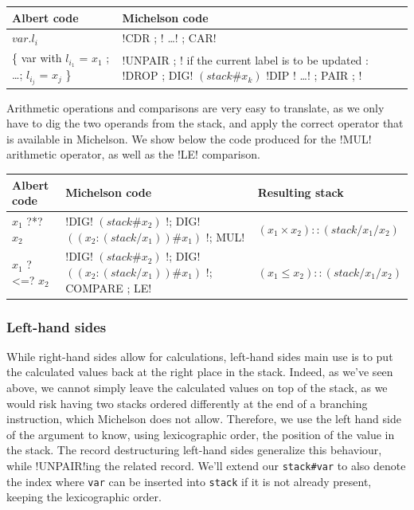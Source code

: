 \documentclass{report}
\begin{document}
{\small
\begin{longtable}{l|p{10cm}}
  Albert code & Michelson code \\
  \hline
  $var.l_i$ & !CDR ; ! \ldots ! ; CAR! \\
  \hline
  \{ var with $l_{i_1}$ = $x_1$ ; \ldots ; $l_{i_j}$ = $x_j$ \} & !UNPAIR ; ! \newline
  if the current label is to be updated : !DROP ; DIG! $(stack\#x_k)$ \newline
  !DIP {! \ldots !} ; PAIR ; !
\end{longtable}
}

Arithmetic operations and comparisons are very easy to translate, as we only have to dig the two operands from the stack, and apply the correct operator that is available in Michelson. We show below the code produced for the !MUL! arithmetic operator, as well as the !LE! comparison.

{\small
\begin{longtable}{l|p{9.5cm}|l}
  Albert code & Michelson code & Resulting stack\\
  \hline
  $x_1$ ?*? $x_2$ & !DIG! $(stack\#x_2)$ !; DIG! $((x_2:(stack/x_1))\#x_1)$ !; MUL! & $(x_1 \times x_2)::(stack/x_1/x_2)$\\
  \hline
  $x_1$ ?<=? $x_2$ & !DIG! $(stack\#x_2)$ !; DIG! $((x_2:(stack/x_1))\#x_1)$ !; COMPARE ; LE! & $(x_1 \le x_2)::(stack/x_1/x_2)$\\
\end{longtable}
}

\subsubsection{Left-hand sides}

While right-hand sides allow for calculations, left-hand sides main use is to put the calculated values back at the right place in the stack. Indeed, as we've seen above, we cannot simply leave the calculated values on top of the stack, as we would risk having two stacks ordered differently at the end of a branching instruction, which Michelson does not allow. Therefore, we use the left hand side of the argument to know, using lexicographic order, the position of the value in the stack. The record destructuring left-hand sides generalize this behaviour, while !UNPAIR!ing the related record. We'll extend our \texttt{stack\#var} to also denote the index where \texttt{var} can be inserted into \texttt{stack} if it is not already present, keeping the lexicographic order.
\end{document}
